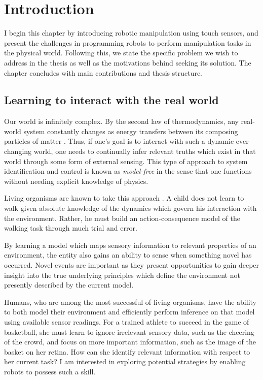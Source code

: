 \chapter{Introduction}
\label{chp:intro}

I begin this chapter by introducing robotic manipulation using touch sensors, and present the challenges in programming robots to perform manipulation tasks in the physical world.
Following this, we state the specific problem we wish to address in the thesis as well as the motivations behind seeking its solution.
The chapter concludes with main contributions and thesis structure.


\section{Learning to interact with the real world}

Our world is infinitely complex.
By the second law of thermodynamics, any real-world system constantly changes as energy transfers between its composing particles of matter \cite{zubarev1974nonequilibrium}. 
Thus, if one's goal is to interact with such a dynamic ever-changing world, one needs to continually infer relevant truths which exist in that world through some form of external sensing.
This type of approach to system identification and control is known as \emph{model-free} \cite{Spall1998} in the sense that one functions without needing explicit knowledge of physics.

Living organisms are known to take this approach \cite{dayan2008decision}. %
A child does not learn to walk given absolute knowledge of the dynamics which govern his interaction with the environment. Rather, he must build an action-consequence model of the walking task through much trial and error.

By learning a model which maps sensory information to relevant properties of an environment, the entity also gains an ability to sense when something novel has occurred.
Novel events are important as they present opportunities to gain deeper insight into the true underlying principles which define the environment not presently described by the current model.

Humans, who are among the most successful of living organisms, have the ability to both model their environment and efficiently perform inference on that model using available sensor readings.
For a trained athlete to succeed in the game of basketball, she must learn to ignore irrelevant sensory data, such as the cheering of the crowd, and focus on more important information, such as the image of the basket on her retina.
How can she identify relevant information with respect to her current task?
I am interested in exploring potential strategies by enabling robots to possess such a skill.

